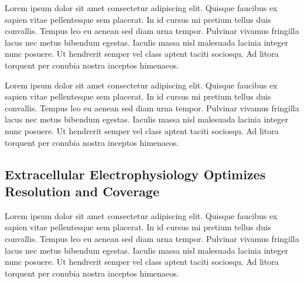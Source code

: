 \documentclass[11pt]{article}
\newcommand{\subsectionwithindent}[1]{
    \subsection*{#1}
    \hspace{\parindent} %
}
\begin{document}
Lorem ipsum dolor sit amet consectetur adipiscing elit. Quisque faucibus ex sapien vitae pellentesque sem placerat. In id cursus mi pretium tellus duis convallis. Tempus leo eu aenean sed diam urna tempor. Pulvinar vivamus fringilla lacus nec metus bibendum egestas. Iaculis massa nisl malesuada lacinia integer nunc posuere. Ut hendrerit semper vel class aptent taciti sociosqu. Ad litora torquent per conubia nostra inceptos himenaeos.

Lorem ipsum dolor sit amet consectetur adipiscing elit. Quisque faucibus ex sapien vitae pellentesque sem placerat. In id cursus mi pretium tellus duis convallis. Tempus leo eu aenean sed diam urna tempor. Pulvinar vivamus fringilla lacus nec metus bibendum egestas. Iaculis massa nisl malesuada lacinia integer nunc posuere. Ut hendrerit semper vel class aptent taciti sociosqu. Ad litora torquent per conubia nostra inceptos himenaeos.

\subsectionwithindent{Extracellular Electrophysiology Optimizes Resolution and Coverage}
Lorem ipsum dolor sit amet consectetur adipiscing elit. Quisque faucibus ex sapien vitae pellentesque sem placerat. In id cursus mi pretium tellus duis convallis. Tempus leo eu aenean sed diam urna tempor. Pulvinar vivamus fringilla lacus nec metus bibendum egestas. Iaculis massa nisl malesuada lacinia integer nunc posuere. Ut hendrerit semper vel class aptent taciti sociosqu. Ad litora torquent per conubia nostra inceptos himenaeos.
\end{document}
